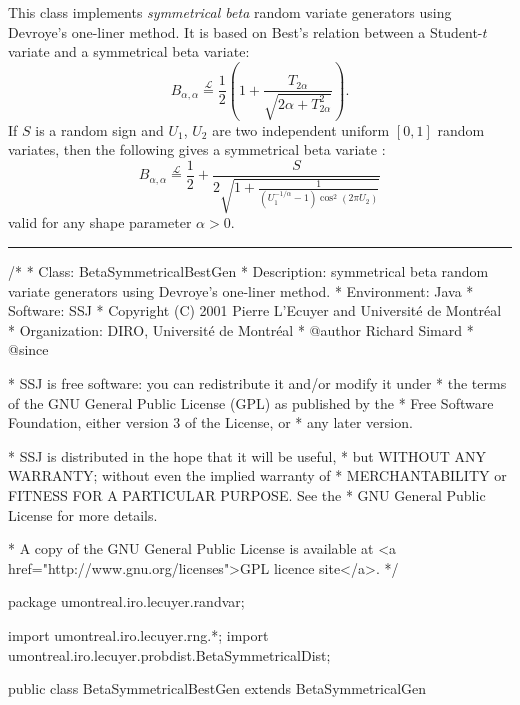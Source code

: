 
This class implements {\em symmetrical beta\/} random variate generators using
Devroye's one-liner method. It is based on Best's relation  \cite{rBES78a} 
between a Student-$t$ variate and a symmetrical beta variate:
\[
  B_{\alpha, \alpha} \stackrel{\mathcal L}{=} \frac 1 2 \left(
  1 + \frac{T_{2\alpha}}{\sqrt{2\alpha + T_{2\alpha}^2}}\right).
\]
If $S$ is a random sign and $U_1$, $U_2$ are two independent uniform $[0,1]$
random variates, then the following gives a symmetrical
 beta variate \cite{rDEV96a}:
\begin{equation}
  B_{\alpha, \alpha} \stackrel{\mathcal L}{=} \frac 1 2 + \frac{S}{2
  \sqrt{1 + \frac{1}{\left(U_1^{-1/\alpha} - 1\right)\cos^2(2\pi U_2)}}}
\label{eq.beta.best}
\end{equation}
valid for any shape parameter $\alpha > 0$.



\bigskip\hrule

\begin{code}
\begin{hide}
/*
 * Class:        BetaSymmetricalBestGen
 * Description:  symmetrical beta random variate generators using
                 Devroye's one-liner method.
 * Environment:  Java
 * Software:     SSJ 
 * Copyright (C) 2001  Pierre L'Ecuyer and Université de Montréal
 * Organization: DIRO, Université de Montréal
 * @author       Richard Simard
 * @since

 * SSJ is free software: you can redistribute it and/or modify it under
 * the terms of the GNU General Public License (GPL) as published by the
 * Free Software Foundation, either version 3 of the License, or
 * any later version.

 * SSJ is distributed in the hope that it will be useful,
 * but WITHOUT ANY WARRANTY; without even the implied warranty of
 * MERCHANTABILITY or FITNESS FOR A PARTICULAR PURPOSE.  See the
 * GNU General Public License for more details.

 * A copy of the GNU General Public License is available at
   <a href="http://www.gnu.org/licenses">GPL licence site</a>.
 */
\end{hide}
package umontreal.iro.lecuyer.randvar;\begin{hide}
import umontreal.iro.lecuyer.rng.*;
import umontreal.iro.lecuyer.probdist.BetaSymmetricalDist;
\end{hide}

public class BetaSymmetricalBestGen extends BetaSymmetricalGen \begin{hide} {
   private RandomStream stream2;
   private RandomStream stream3;
   private double afactor;          // = 1/alpha
   private static final double TWOPI = 2.0*Math.PI;      // = 2 Pi
\end{hide}
\end{code}

